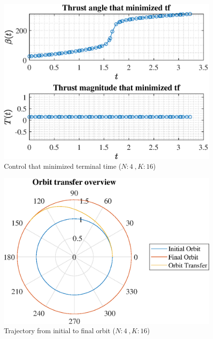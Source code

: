 \documentclass[]{article}
\begin{document}
	\begin{figure}
		\centering
		\includegraphics[scale=0.75]{control_N4_K16_C2_tf.eps}
		\caption{Control that minimized terminal time (\(N:4\ , K:16\))}
		\label{fig:control_N4_K16_C2_tf}
	\end{figure}
	\begin{figure}
		\centering
		\includegraphics[scale=0.75]{orbit_N4_K16_C2_tf.eps}
		\caption{Trajectory from initial to final orbit (\(N:4\ , K:16\))}
		\label{fig:orbit_N4_K16_C2_tf}
	\end{figure}
\end{document}
